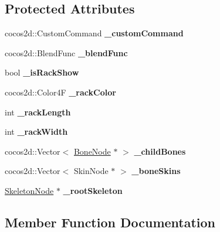 \subsection*{Protected Attributes}
\begin{DoxyCompactItemize}
\item 
\mbox{\label{classBoneNode_a0c99a80b4be531eaa029fcd0cfdaae72}} 
cocos2d\+::\+Custom\+Command {\bfseries \+\_\+custom\+Command}
\item 
\mbox{\label{classBoneNode_a293ac4ff7361707206c46f0c48cc6bb8}} 
cocos2d\+::\+Blend\+Func {\bfseries \+\_\+blend\+Func}
\item 
\mbox{\label{classBoneNode_a10844080d7138f941381c90d985a680c}} 
bool {\bfseries \+\_\+is\+Rack\+Show}
\item 
\mbox{\label{classBoneNode_a31b946e5d5ea0c1f3899302b6d35057e}} 
cocos2d\+::\+Color4F {\bfseries \+\_\+rack\+Color}
\item 
\mbox{\label{classBoneNode_a1a5e14ac8958fecf5e6d264a27abd4f0}} 
int {\bfseries \+\_\+rack\+Length}
\item 
\mbox{\label{classBoneNode_a0605b79a9cac522982a49c0c791d7e6d}} 
int {\bfseries \+\_\+rack\+Width}
\item 
\mbox{\label{classBoneNode_a14ceefdcc20798bddf531a2366a5064e}} 
cocos2d\+::\+Vector$<$ \hyperlink{classBoneNode}{Bone\+Node} $\ast$ $>$ {\bfseries \+\_\+child\+Bones}
\item 
\mbox{\label{classBoneNode_ad68ab6383c408c70c43ca7c93e4e9866}} 
cocos2d\+::\+Vector$<$ Skin\+Node $\ast$ $>$ {\bfseries \+\_\+bone\+Skins}
\item 
\mbox{\label{classBoneNode_a1549512fb4adfe78322c9bdd743e48c6}} 
\hyperlink{classSkeletonNode}{Skeleton\+Node} $\ast$ {\bfseries \+\_\+root\+Skeleton}
\end{DoxyCompactItemize}


\subsection{Member Function Documentation}
\mbox{\label{classBoneNode_a82a5e5dcbc6749a7cf9ce54d0f121605}} 
